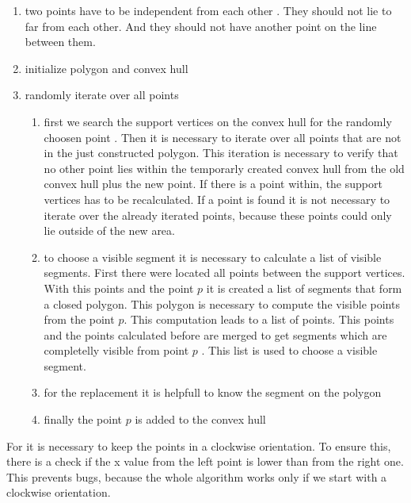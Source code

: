 \begin{enumerate}
  \item \label{en:sg:a} two points have to be independent from each other
    . They should not lie to far from each other. And they should
    not have another point on the line between them.
  \item \label{en:sg:b} initialize polygon and convex hull
  \item \label{en:sg:c} randomly iterate over all points
  \begin{enumerate}
    \item \label{en:sg:d} first we search the support vertices on the convex
      hull  for the randomly choosen point .
      Then it is necessary to iterate over all points that are not in the
      just constructed polygon. This iteration is necessary to verify that no
      other point lies within the temporarly created convex hull from the old
      convex hull plus the new point. If there is a point within, the support
      vertices has to be recalculated. If a point is found it is
      not necessary to iterate over the already iterated points, because these
      points could only lie outside of the new area.
    \item \label{en:sg:e}to choose a visible segment it is necessary
      to calculate a list of visible segments. First there were
      located all points between the support vertices. With this
      points and the point $p$ it is created a list of segments that
      form a closed polygon. This polygon is necessary to compute the
      visible points from the point $p$. This computation leads to a
      list of points. This points  and the points
      calculated before  are merged to get
      segments which are completelly visible from point $p$ .
      This list is used to choose a visible segment.
    \item \label{en:sg:f}for the replacement it is helpfull to know the segment
      on the polygon
    \item \label{en:sg:g}finally the point $p$ is added to the convex hull
  \end{enumerate}
\end{enumerate}

For  it is necessary to keep the points in a clockwise
orientation. To ensure this, there is a check if the x value from the
left point is lower than from the right one. This prevents bugs,
because the whole algorithm works only if we start with a clockwise
orientation.

